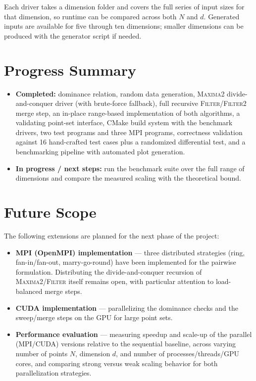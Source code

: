 \documentclass[11pt]{article}
\begin{document}
Each driver takes a dimension folder and covers the full series of input
sizes for that dimension, so runtime can be compared across both $N$ and
$d$. Generated inputs are available for five through ten dimensions;
smaller dimensions can be produced with the generator script if needed.

\section{Progress Summary}

\begin{itemize}
    \item \textbf{Completed:} dominance relation, random data generation,
    \textsc{Maxima2} divide-and-conquer driver (with brute-force
    fallback), full recursive \textsc{Filter}/\textsc{Filter2} merge
    step, an in-place range-based implementation of both algorithms, a
    validating point-set interface, CMake build system with the
    benchmark drivers, two test programs and three MPI programs,
    correctness validation against 16 hand-crafted test cases plus a
    randomized differential test, and a benchmarking pipeline with
    automated plot generation.
    \item \textbf{In progress / next steps:} run the benchmark suite over
    the full range of dimensions and compare the measured scaling with
    the theoretical bound.
\end{itemize}

\section{Future Scope}

The following extensions are planned for the next phase of the project:

\begin{itemize}
    \item \textbf{MPI (OpenMPI) implementation} --- three distributed
    strategies (ring, fan-in/fan-out, marry-go-round) have been
    implemented for the pairwise formulation. Distributing the
    divide-and-conquer recursion of \textsc{Maxima2}/\textsc{Filter}
    itself remains open, with particular attention to load-balanced merge
    steps.
    \item \textbf{CUDA implementation} --- parallelizing the dominance
    checks and the sweep/merge steps on the GPU for large point sets.
    \item \textbf{Performance evaluation} --- measuring speedup and
    scale-up of the parallel (MPI/CUDA) versions relative to the
    sequential baseline, across varying number of points $N$, dimension
    $d$, and number of processes/threads/GPU cores, and comparing strong
    versus weak scaling behavior for both parallelization strategies.
\end{itemize}
\end{document}
